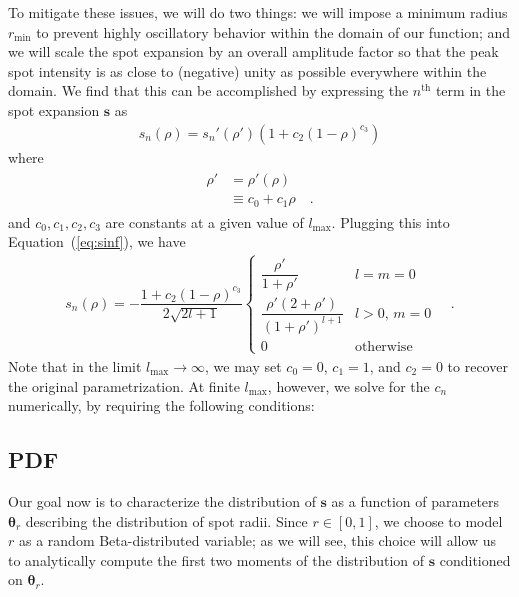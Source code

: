 \documentclass[modern]{aastex62}
\begin{document}
To mitigate these issues, we will do two things: we will impose a minimum
radius $r_{\mathrm{min}}$ to prevent highly oscillatory behavior within
the domain of our function; and we will scale the spot expansion
by an overall amplitude factor so that
the peak spot intensity is as close to (negative) unity as possible
everywhere within the domain.
We find that this can be accomplished by expressing the
$n^{\mathrm{th}}$ term in the spot expansion $\mathbf{s}$ as
%
\begin{align}
    s_n(\rho) = s_n'\left( \rho' \right) \left(1 + c_2 \left(1 - \rho\right) ^ {c_3}\right)
\end{align}
%
where
%
\begin{align}
    \begin{split}
        \rho' &= \rho'\left(\rho\right) \\ &\equiv c_0 + c_1\rho
        \quad.
    \end{split}
\end{align}
%
and $c_0, c_1, c_2, c_3$ are constants at a given
value of $l_{\mathrm{max}}$.
%
Plugging this into Equation~(\ref{eq:sinf}), we have
%
\begin{align}
    \label{eq:s}
    s_{n}(\rho) =
    -\dfrac{1 + c_2 \left(1 - \rho\right) ^ {c_3}}{2\sqrt{2l + 1}}
    \begin{cases}
        \dfrac{\rho'}{1 + \rho'}
         & l = m = 0
        \\[1em]
        \dfrac{ \rho' \left( 2 + \rho' \right)}
        {\left(1 + \rho'\right)^{l + 1}}
         & l > 0, \, m = 0
        \\[1em]
        0
         & \mathrm{otherwise}
    \end{cases}
    \quad.
\end{align}
%
Note that in the limit $l_{\mathrm{max}} \rightarrow \infty$, we may set
$c_0 = 0$, $c_1 = 1$, and $c_2 = 0$ to recover the original parametrization.
At finite $l_{\mathrm{max}}$, however, we solve for the $c_n$ numerically,
by requiring the following conditions:


\subsection{PDF}
\label{sec:size-pdf}
%
Our goal now is to characterize the distribution of $\mathbf{s}$ as a
function of parameters $\pmb{\theta}_r$ describing the distribution of
spot radii. Since $r \in [0, 1]$, we choose to model $r$ as a random
Beta-distributed variable; as we will see, this choice will allow us to
analytically compute the first two moments of the distribution of
$\mathbf{s}$ conditioned on $\pmb{\theta}_r$.
\end{document}
